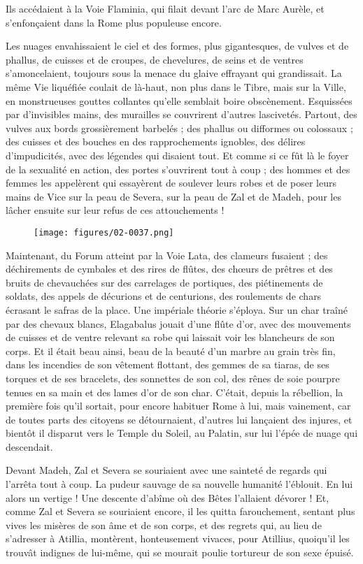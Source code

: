 \documentclass[a4paper, 11pt, oneside, polutonikogreek, french]{article}
\begin{document}
Ils accédaient à la Voie Flaminia, qui filait devant l'arc de Marc Aurèle, et s'enfonçaient dans la Rome plus populeuse encore.

Les nuages envahissaient le ciel et des formes, plus gigantesques, de vulves et de phallus, de cuisses et de croupes, de chevelures, de seins et de ventres s'amoncelaient, toujours sous la menace du glaive effrayant qui grandissait. La même Vie liquéfiée coulait de là-haut, non plus dans le Tibre, mais sur la Ville, en monstrueuses gouttes collantes qu'elle semblait boire obscènement. Esquissées par d'invisibles mains, des murailles se couvrirent d'autres lascivetés. Partout, des vulves aux bords grossièrement barbelés ; des phallus ou difformes ou colossaux ; des cuisses et des bouches en des rapprochements ignobles, des délires d'impudicités, avec des légendes qui disaient tout. Et comme si ce fût là le foyer de la sexualité en action, des portes s'ouvrirent tout à coup ; des hommes et des femmes les appelèrent qui essayèrent de soulever leurs robes et de poser leurs mains de Vice sur la peau de Severa, sur la peau de Zal et de Madeh, pour les lâcher ensuite sur leur refus de ces attouchements !
\begin{figure}[H]
\centering
\texttt{[image: figures/02-0037.png]}
\end{figure}
Maintenant, du Forum atteint par la Voie Lata, des clameurs fusaient ; des déchirements de cymbales et des rires de flûtes, des chœurs de prêtres et des bruits de chevauchées sur des carrelages de portiques, des piétinements de soldats, des appels de décurions et de centurions, des roulements de chars écrasant le safras de la place. Une impériale théorie s'éploya. Sur un char traîné par des chevaux blancs, Elagabalus jouait d'une flûte d'or, avec des mouvements de cuisses et de ventre relevant sa robe qui laissait voir les blancheurs de son corps. Et il était beau ainsi, beau de la beauté d'un marbre au grain très fin, dans les incendies de son vêtement flottant, des gemmes de sa tiaras, de ses torques et de ses bracelets, des sonnettes de son col, des rênes de soie pourpre tenues en sa main et des lames d'or de son char. C'était, depuis la rébellion, la première fois qu'il sortait, pour encore habituer Rome à lui, mais vainement, car de toutes parts des citoyens se détournaient, d'autres lui lançaient des injures, et bientôt il disparut vers le Temple du Soleil, au Palatin, sur lui l'épée de nuage qui descendait.

Devant Madeh, Zal et Severa se souriaient avec une sainteté de regards qui l'arrêta tout à coup. La pudeur sauvage de sa nouvelle humanité l'éblouit. En lui alors un vertige ! Une descente d'abîme où des Bêtes l'allaient dévorer ! Et, comme Zal et Severa se souriaient encore, il les quitta farouchement, sentant plus vives les misères de son âme et de son corps, et des regrets qui, au lieu de s'adresser à Atillia, montèrent, honteusement vivaces, pour Atillius, quoiqu'il les trouvât indignes de lui-même, qui se mourait poulie tortureur de son sexe épuisé.
\clearpage
\end{document}
